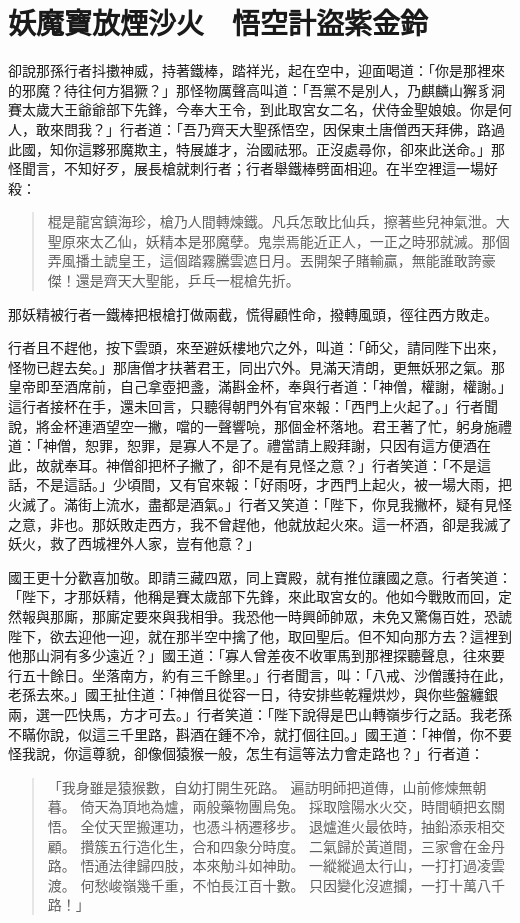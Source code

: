 
\chapter{妖魔寶放煙沙火　悟空計盜紫金鈴}

卻說那孫行者抖擻神威，持著鐵棒，踏祥光，起在空中，迎面喝道：「你是那裡來的邪魔？待往何方猖獗？」那怪物厲聲高叫道：「吾黨不是別人，乃麒麟山獬豸洞賽太歲大王爺爺部下先鋒，今奉大王令，到此取宮女二名，伏侍金聖娘娘。你是何人，敢來問我？」行者道：「吾乃齊天大聖孫悟空，因保東土唐僧西天拜佛，路過此國，知你這夥邪魔欺主，特展雄才，治國祛邪。正沒處尋你，卻來此送命。」那怪聞言，不知好歹，展長槍就刺行者；行者舉鐵棒劈面相迎。在半空裡這一場好殺：
\begin{quote}
棍是龍宮鎮海珍，槍乃人間轉煉鐵。凡兵怎敢比仙兵，擦著些兒神氣泄。大聖原來太乙仙，妖精本是邪魔孽。鬼祟焉能近正人，一正之時邪就滅。那個弄風播土諕皇王，這個踏霧騰雲遮日月。丟開架子賭輸贏，無能誰敢誇豪傑！還是齊天大聖能，乒乓一棍槍先折。
\end{quote}

那妖精被行者一鐵棒把根槍打做兩截，慌得顧性命，撥轉風頭，徑往西方敗走。

行者且不趕他，按下雲頭，來至避妖樓地穴之外，叫道：「師父，請同陛下出來，怪物已趕去矣。」那唐僧才扶著君王，同出穴外。見滿天清朗，更無妖邪之氣。那皇帝即至酒席前，自己拿壺把盞，滿斟金杯，奉與行者道：「神僧，權謝，權謝。」這行者接杯在手，還未回言，只聽得朝門外有官來報：「西門上火起了。」行者聞說，將金杯連酒望空一撇，噹的一聲響喨，那個金杯落地。君王著了忙，躬身施禮道：「神僧，恕罪，恕罪，是寡人不是了。禮當請上殿拜謝，只因有這方便酒在此，故就奉耳。神僧卻把杯子撇了，卻不是有見怪之意？」行者笑道：「不是這話，不是這話。」少頃間，又有官來報：「好雨呀，才西門上起火，被一場大雨，把火滅了。滿街上流水，盡都是酒氣。」行者又笑道：「陛下，你見我撇杯，疑有見怪之意，非也。那妖敗走西方，我不曾趕他，他就放起火來。這一杯酒，卻是我滅了妖火，救了西城裡外人家，豈有他意？」

國王更十分歡喜加敬。即請三藏四眾，同上寶殿，就有推位讓國之意。行者笑道：「陛下，才那妖精，他稱是賽太歲部下先鋒，來此取宮女的。他如今戰敗而回，定然報與那廝，那廝定要來與我相爭。我恐他一時興師帥眾，未免又驚傷百姓，恐諕陛下，欲去迎他一迎，就在那半空中擒了他，取回聖后。但不知向那方去？這裡到他那山洞有多少遠近？」國王道：「寡人曾差夜不收軍馬到那裡探聽聲息，往來要行五十餘日。坐落南方，約有三千餘里。」行者聞言，叫：「八戒、沙僧護持在此，老孫去來。」國王扯住道：「神僧且從容一日，待安排些乾糧烘炒，與你些盤纏銀兩，選一匹快馬，方才可去。」行者笑道：「陛下說得是巴山轉嶺步行之話。我老孫不瞞你說，似這三千里路，斟酒在鍾不冷，就打個往回。」國王道：「神僧，你不要怪我說，你這尊貌，卻像個猿猴一般，怎生有這等法力會走路也？」行者道：
\begin{quote}
「我身雖是猿猴數，自幼打開生死路。
遍訪明師把道傳，山前修煉無朝暮。
倚天為頂地為爐，兩般藥物團烏兔。
採取陰陽水火交，時間頓把玄關悟。
全仗天罡搬運功，也憑斗柄遷移步。
退爐進火最依時，抽鉛添汞相交顧。
攢簇五行造化生，合和四象分時度。
二氣歸於黃道間，三家會在金丹路。
悟通法律歸四肢，本來觔斗如神助。
一縱縱過太行山，一打打過凌雲渡。
何愁峻嶺幾千重，不怕長江百十數。
只因變化沒遮攔，一打十萬八千路！」
\end{quote}

